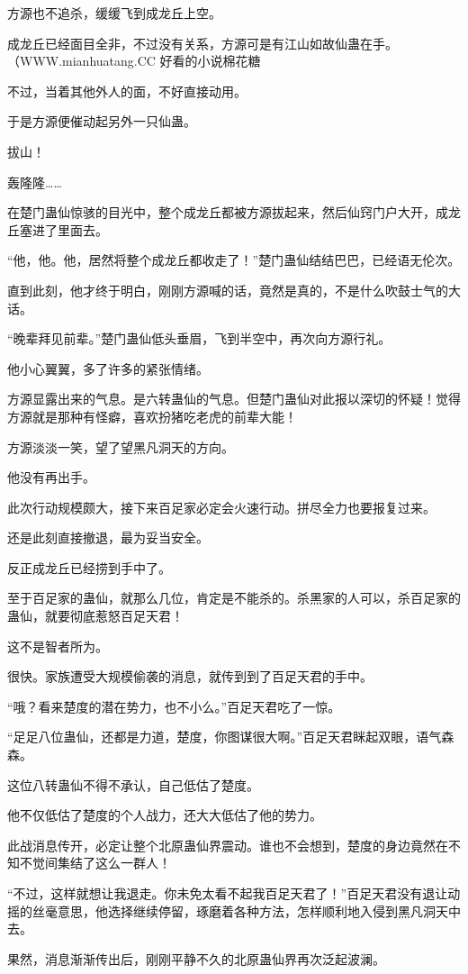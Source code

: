 \begin{this_body}
方源也不追杀，缓缓飞到成龙丘上空。

成龙丘已经面目全非，不过没有关系，方源可是有江山如故仙蛊在手。（WWW.mianhuatang.CC 好看的小说棉花糖

不过，当着其他外人的面，不好直接动用。

于是方源便催动起另外一只仙蛊。

拔山！

轰隆隆……

在楚门蛊仙惊骇的目光中，整个成龙丘都被方源拔起来，然后仙窍门户大开，成龙丘塞进了里面去。

“他，他。他，居然将整个成龙丘都收走了！”楚门蛊仙结结巴巴，已经语无伦次。

直到此刻，他才终于明白，刚刚方源喊的话，竟然是真的，不是什么吹鼓士气的大话。

“晚辈拜见前辈。”楚门蛊仙低头垂眉，飞到半空中，再次向方源行礼。

他小心翼翼，多了许多的紧张情绪。

方源显露出来的气息。是六转蛊仙的气息。但楚门蛊仙对此报以深切的怀疑！觉得方源就是那种有怪癖，喜欢扮猪吃老虎的前辈大能！

方源淡淡一笑，望了望黑凡洞天的方向。

他没有再出手。

此次行动规模颇大，接下来百足家必定会火速行动。拼尽全力也要报复过来。

还是此刻直接撤退，最为妥当安全。

反正成龙丘已经捞到手中了。

至于百足家的蛊仙，就那么几位，肯定是不能杀的。杀黑家的人可以，杀百足家的蛊仙，就要彻底惹怒百足天君！

这不是智者所为。

很快。家族遭受大规模偷袭的消息，就传到到了百足天君的手中。

“哦？看来楚度的潜在势力，也不小么。”百足天君吃了一惊。

“足足八位蛊仙，还都是力道，楚度，你图谋很大啊。”百足天君眯起双眼，语气森森。

这位八转蛊仙不得不承认，自己低估了楚度。

他不仅低估了楚度的个人战力，还大大低估了他的势力。

此战消息传开，必定让整个北原蛊仙界震动。谁也不会想到，楚度的身边竟然在不知不觉间集结了这么一群人！

“不过，这样就想让我退走。你未免太看不起我百足天君了！”百足天君没有退让动摇的丝毫意思，他选择继续停留，琢磨着各种方法，怎样顺利地入侵到黑凡洞天中去。

果然，消息渐渐传出后，刚刚平静不久的北原蛊仙界再次泛起波澜。


\end{this_body}
